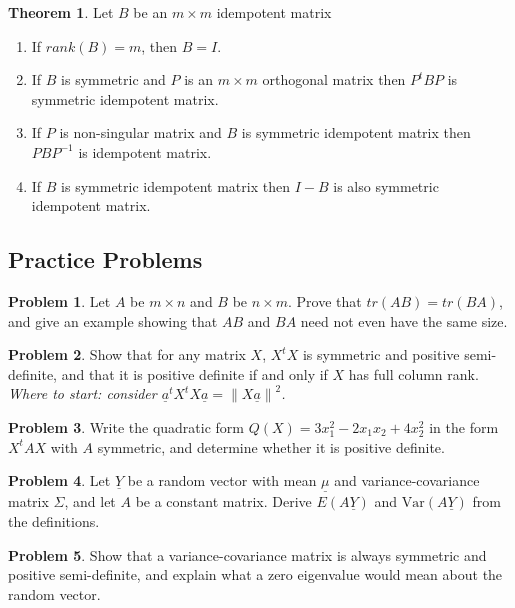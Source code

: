 \documentclass[11pt,a4paper]{article}
\theoremstyle{definition}
\newtheorem{thm}{Theorem}[subsection]
\newtheorem{problemx}{Problem}[section]
\newenvironment{problem}{\begin{problemx}}{\end{problemx}}
\begin{document}
\begin{thm}\label{res:thm:1.3.4}
Let $B$ be an $m\times m$ idempotent matrix
\begin{enumerate}
\item[i.] If $rank(B)=m$, then $B=I$.
\item[ii.] If $B$ is symmetric and $P$ is an $m\times m$ orthogonal matrix then $P^tBP$ is symmetric idempotent matrix.
\item[iii.] If $P$ is non-singular matrix and $B$ is symmetric idempotent matrix then $PBP^{-1}$ is idempotent matrix.
\item[iv.] If $B$ is symmetric idempotent matrix then $I-B$ is also symmetric idempotent matrix.
\end{enumerate}
\end{thm}


\subsection{Practice Problems}

\begin{problem}
Let $A$ be $m\times n$ and $B$ be $n\times m$. Prove that
$tr\left(AB\right)=tr\left(BA\right)$, and give an example showing that
$AB$ and $BA$ need not even have the same size.
\end{problem}

\begin{problem}
Show that for any matrix $X$, $X^tX$ is symmetric and positive semi-definite,
and that it is positive definite if and only if $X$ has full column rank.
\emph{Where to start: consider $\underline{a}^tX^tX\underline{a}
=\left\|X\underline{a}\right\|^2$.}
\end{problem}

\begin{problem}
Write the quadratic form $Q(X)=3x_1^2-2x_1x_2+4x_2^2$ in the form
$X^tAX$ with $A$ symmetric, and determine whether it is positive definite.
\end{problem}

\begin{problem}
Let $\underline{Y}$ be a random vector with mean $\underline{\mu}$ and
variance-covariance matrix $\Sigma$, and let $A$ be a constant matrix. Derive
$E\left(A\underline{Y}\right)$ and
$\text{Var}\left(A\underline{Y}\right)$ from the definitions.
\end{problem}

\begin{problem}
Show that a variance-covariance matrix is always symmetric and positive
semi-definite, and explain what a zero eigenvalue would mean about the random
vector.
\end{problem}
\end{document}
